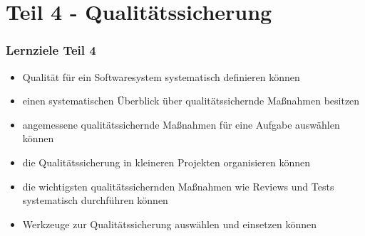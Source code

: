 \part{Teil 4 - Qualitätssicherung}

\newpage
\section*{Lernziele Teil 4}

\begin{itemize}
    \item Qualität für ein Softwaresystem systematisch definieren können
    \item einen systematischen Überblick über qualitätssichernde Maßnahmen besitzen
    \item angemessene qualitätssichernde Maßnahmen für eine Aufgabe auswählen können
    \item die Qualitätssicherung in kleineren Projekten organisieren können
    \item die wichtigsten qualitätssichernden Maßnahmen wie Reviews und Tests systematisch durchführen können
    \item Werkzeuge zur Qualitätssicherung auswählen und einsetzen können
\end{itemize}

\newpage